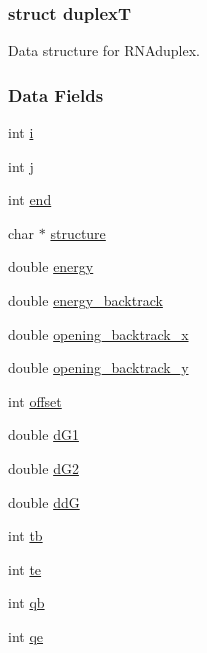 \subsubsection{struct duplexT}
Data structure for R\+N\+Aduplex. \subsubsection*{Data Fields}
\begin{DoxyCompactItemize}
\item 
int \mbox{\hyperlink{group__data__structures_a71b0cd935f8c2879ced9083548f69fe0}{i}}
\item 
int \mbox{\hyperlink{group__data__structures_a09ff6dcd84fb1dde05d6660f119524cb}{j}}
\item 
int \mbox{\hyperlink{group__data__structures_afd18437773841e3c12a8ed0ab795c58f}{end}}
\item 
char $\ast$ \mbox{\hyperlink{group__data__structures_a94aedc565681eb17ddb20e1674d480aa}{structure}}
\item 
double \mbox{\hyperlink{group__data__structures_add23a5303db25aabdb27753c02e99cf3}{energy}}
\item 
double \mbox{\hyperlink{group__data__structures_aef9a632d9694c7ea31483a7609a42967}{energy\+\_\+backtrack}}
\item 
double \mbox{\hyperlink{group__data__structures_aaaedab824d41bc1f03e895e2e2ab59cb}{opening\+\_\+backtrack\+\_\+x}}
\item 
double \mbox{\hyperlink{group__data__structures_ac8138ee4d83ab1b2045bcb68fafce199}{opening\+\_\+backtrack\+\_\+y}}
\item 
int \mbox{\hyperlink{group__data__structures_a8e9f9149cf74ee059a6c6e0fe16158e3}{offset}}
\item 
double \mbox{\hyperlink{group__data__structures_a7fd3536da56bbf0b751d239e0aec66f9}{d\+G1}}
\item 
double \mbox{\hyperlink{group__data__structures_a56668defcc6307e547bce8308a90d111}{d\+G2}}
\item 
double \mbox{\hyperlink{group__data__structures_a70aa763754db483a68b2211e41028a19}{ddG}}
\item 
int \mbox{\hyperlink{group__data__structures_a621c43749af9eb035e88709413b6f16a}{tb}}
\item 
int \mbox{\hyperlink{group__data__structures_a6b5ef5f69ab54f98a79751cb8067fdd5}{te}}
\item 
int \mbox{\hyperlink{group__data__structures_ac4102dba131ead051c1a2e057682ad3b}{qb}}
\item 
int \mbox{\hyperlink{group__data__structures_a646fc81b15d7cf7a934606acf039c128}{qe}}
\end{DoxyCompactItemize}


